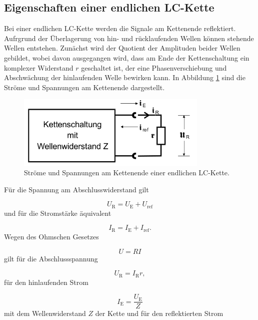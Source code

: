 \subsection{Eigenschaften einer endlichen LC-Kette}

Bei einer endlichen LC-Kette werden die Signale am Kettenende reflektiert.
Aufrgrund der Überlagerung von hin- und rücklaufenden Wellen können
stehende Wellen entstehen.
Zunächst wird der Quotient der Amplituden beider Wellen gebildet, wobei davon
ausgegangen wird, dass am Ende der Kettenschaltung ein komplexer Widerstand
$r$ geschaltet ist, der eine Phasenverschiebung und Abschwächung der
hinlaufenden Welle bewirken kann.
In Abbildung \ref{fig:Abschluss} sind die Ströme und Spannungen am Kettenende
dargestellt.

\begin{figure}
  \centering
  \includegraphics[height = 3.5cm]{Abschlusswiderstand.png}
  \caption{Ströme und Spannungen am Kettenende einer endlichen LC-Kette.}
  \label{fig:Abschluss}
\end{figure}

Für die Spannung am Abschlusswiderstand gilt

\begin{equation}
  U_\text{R} = U_\text{E} + U_\text{ref}
\end{equation}
und für die Stromstärke äquivalent

\begin{equation}
  I_\text{R} = I_\text{E} + I_\text{ref}.
\end{equation}
Wegen des Ohmschen Gesetzes

\begin{equation}
  U = RI
\end{equation}
gilt für die Abschlussspannung

\begin{equation}
  U_\text{R} = I_\text{R} r,
\end{equation}
für den hinlaufenden Strom

\begin{equation}
  I_\text{E} = \frac{U_\text{E}}{Z}
\end{equation}
mit dem Wellenwiderstand $Z$ der Kette und für den reflektierten Strom

